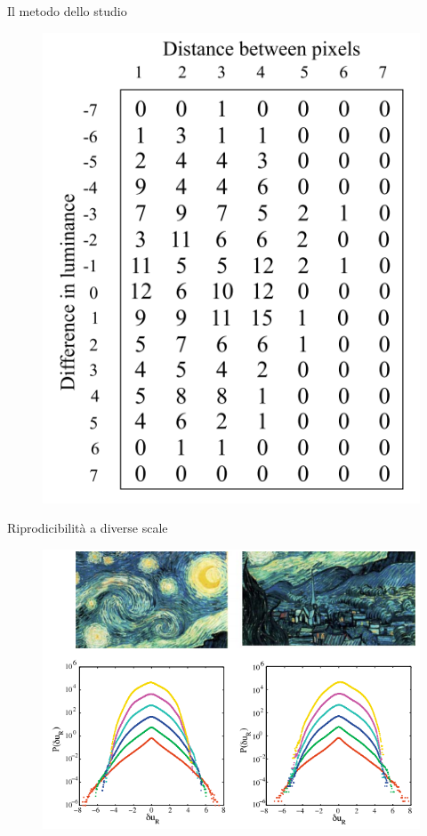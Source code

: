 \documentclass[11pt]{beamer}
\begin{document}
\begin{frame}{Il metodo dello studio}
\begin{figure}
\centering
\includegraphics[scale=0.27]{studio2.png}
\end{figure}
\end{frame}

\begin{frame}{Riprodicibilità a diverse scale}
\begin{figure}
\centering
\includegraphics[scale=0.43]{studio3.png}
\end{figure}
\end{frame}
\end{document}
